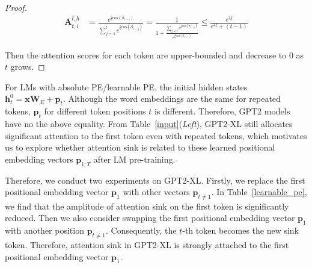 \begin{proof}
\begin{align}
\boldsymbol{A}_{t\textrm{,}\,i}^{l\textrm{,}\,h}&=\frac{e^{\xi\textrm{cos}(\beta_{t-i})}}{\sum_{j=1}^te^{\xi\textrm{cos}(\beta_{t-j})}}
=\frac{1}{1+\frac{\sum_{j\neq i}e^{\xi\textrm{cos}(\beta_{t-j})}}{e^{\xi\textrm{cos}(\beta_{t-i})}}}
\leq\frac{e^{2\xi}}{e^{2\xi}+(t-1)}
\end{align}


Then the attention scores for each token are upper-bounded and decrease to $0$ as $t$ grows.
\end{proof}

For LMs with absolute PE/learnable PE, the initial hidden states $\boldsymbol{h}_t^0=\boldsymbol{x}\boldsymbol{W}_E+\boldsymbol{p}_t$. Although the word embeddings are the same for repeated tokens, $\boldsymbol{p}_t$ for different token positions $t$ is different. Therefore, GPT2 models have no the above equality. From Table~\ref{input}(\emph{Left}), GPT2-XL still allocates significant attention to the first token even with repeated tokens, which motivates us to explore whether attention sink is related to these learned positional embedding vectors $\boldsymbol{p}_{1:T}$ after LM pre-training.

Therefore, we conduct two experiments on GPT2-XL. Firstly, we replace the first positional embedding vector $\boldsymbol{p}_1$ with other vectors $\boldsymbol{p}_{t\neq 1}$. In Table~\ref{learnable_pe}, we find that the amplitude of attention sink on the first token is significantly reduced. Then we also consider swapping the first positional embedding vector $\boldsymbol{p}_1$ with another position $\boldsymbol{p}_{t\neq 1}$. Consequently, the $t$-th token becomes the new sink token. Therefore, attention sink in GPT2-XL is strongly attached to the first positional embedding vector $\boldsymbol{p}_1$.


